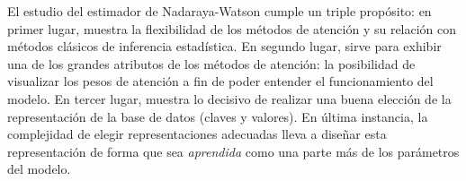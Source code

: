 El estudio del estimador de Nadaraya-Watson cumple un triple propósito: en primer lugar, muestra la flexibilidad de los métodos de atención y su relación con métodos clásicos de inferencia estadística. En segundo lugar, sirve para exhibir una de los grandes atributos de los métodos de atención: la posibilidad de visualizar los pesos de atención a fin de poder entender el funcionamiento del modelo. En tercer lugar, muestra lo decisivo de realizar una buena elección de la representación de la base de datos (claves y valores). En última instancia, la complejidad de elegir representaciones adecuadas lleva a diseñar esta representación de forma que sea \textit{aprendida} como una parte más de los parámetros del modelo.
